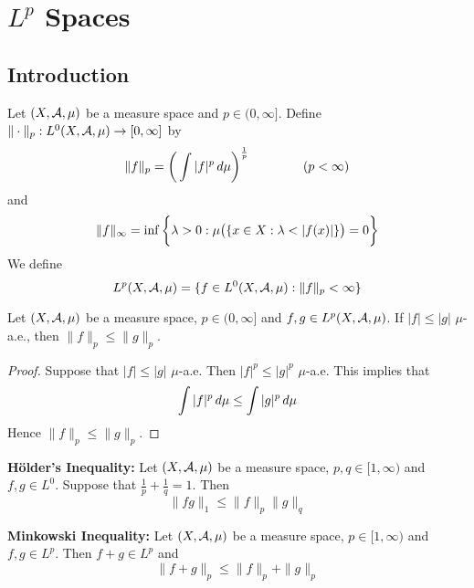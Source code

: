 \documentclass{book}
\begin{document}
	
	
	
	
	
	
	
	
	
	
	
	
	
	
	
	
	
	
	
	
	
	
	
	\newpage
	\chapter{$L^{p}$ Spaces}
	
	\section{Introduction}
	
	\begin{defn}  
		Let $(X, \mathcal{A}, \mu)$ be a measure space and $p \in (0, \infty]$. Define $  \| \cdot \|_p : L^0(X, \mathcal{A}, \mu) \rightarrow [0, \infty]$ by $$\|f \|_p = \bigg(\int | f |^p \, d \mu \bigg)^{\frac{1}{p}} \hspace{1.5cm}( p < \infty)$$ 
		and 
		$$\|f \|_{\infty} = \inf \bigg \{\lambda >0: \mu\big(\{x \in X: \lambda < | f(x) |  \}\big) = 0 \bigg \} $$
		We define $$L^p(X, \mathcal{A}, \mu) =  \{f \in L^0(X, \mathcal{A}, \mu): \|f \|_p < \infty \}$$
	\end{defn}
	
	\begin{ex}  
	Let $(X, \mathcal{A}, \mu)$ be a measure space, $p \in (0, \infty]$ and $f,g \in L^p(X, \mathcal{A}, \mu)$. If $|f| \leq |g|$ $\mu$-a.e., then $\|f\|_p \leq \|g\|_p$.
	\end{ex}
	
	\begin{proof}
	Suppose that $|f| \leq |g|$ $\mu$-a.e. Then $|f|^p \leq |g|^p$ $\mu$-a.e. This implies that $$\int |f|^p \, d \mu \leq  \int |g|^p \, d \mu$$ Hence $\|f\|_p \leq \|g\|_p$.
	\end{proof}
	
	\begin{thm}{\textbf{Hölder's Inequality:}}
		Let $(X, \mathcal{A}, \mu)$ be a measure space, $p,q \in [1, \infty)$ and $f,g \in L^0$. Suppose that $\frac{1}{p} + \frac{1}{q} = 1$. Then $$\|fg\|_1 \leq \|f \|_p \|g \|_q$$
	\end{thm}
	
	\begin{ex}  \textbf{Minkowski Inequality:}
		Let $(X, \mathcal{A}, \mu)$ be a measure space, $p \in [1, \infty)$ and $f,g \in L^p$. Then $f+g \in L^p$ and $$\|f+g\|_p  \leq \|f\|_p + \|g\|_p $$
	\end{ex}
	
\end{document}
